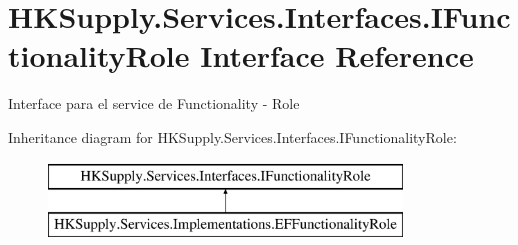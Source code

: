 \hypertarget{interface_h_k_supply_1_1_services_1_1_interfaces_1_1_i_functionality_role}{}\section{H\+K\+Supply.\+Services.\+Interfaces.\+I\+Functionality\+Role Interface Reference}
\label{interface_h_k_supply_1_1_services_1_1_interfaces_1_1_i_functionality_role}


Interface para el service de Functionality -\/ Role  


Inheritance diagram for H\+K\+Supply.\+Services.\+Interfaces.\+I\+Functionality\+Role\+:\begin{figure}[H]
\begin{center}
\leavevmode
\includegraphics[height=2.000000cm]{interface_h_k_supply_1_1_services_1_1_interfaces_1_1_i_functionality_role}
\end{center}
\end{figure}
